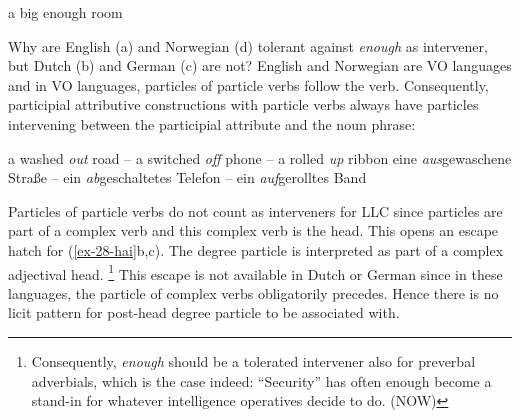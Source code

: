 \documentclass[output=paper
  ,nobabel
  ,uniformtopskip %
]{langscibook}
\begin{document}
\eal\label{ex-28-hai}
\ex\label{ex-bigenough} a big enough room
\label{ex-dedication}
\label{ex-bigroom}

\label{ex-supplies}
\zl

\noindent
Why are English (a) and Norwegian (d) tolerant against \emph{enough}
as intervener, but Dutch (b) and German (c) are not? English and Norwegian are VO languages and in VO languages, particles of particle verbs follow the verb. Consequently, participial attributive constructions with particle verbs always have particles intervening between the participial attribute and the noun phrase:

\eal
\ex a washed \emph{out} road --  a switched \emph{off} phone -- a rolled \emph{up} ribbon
\ex eine \emph{aus}gewaschene Straße	-- ein \emph{ab}geschaltetes Telefon -- ein \emph{auf}gerolltes Band
\zl

\noindent
Particles of particle verbs do not count as interveners for LLC since particles are part of a complex verb and this complex verb is the head. This opens an escape hatch for (\ref{ex-28-hai}b,c). The degree particle is interpreted as part of a complex adjectival head.%
%
\footnote{Consequently, \emph{enough} should be a tolerated intervener also for preverbal adverbials, which is the case indeed:
\ea ``Security'' has often enough become a stand-in for whatever intelligence operatives decide to do. (NOW)
\zlast
}
This escape is not available in Dutch or German since in these languages, the particle of complex verbs obligatorily precedes. Hence there is no licit pattern for post-head degree particle to be associated with.
\end{document}
